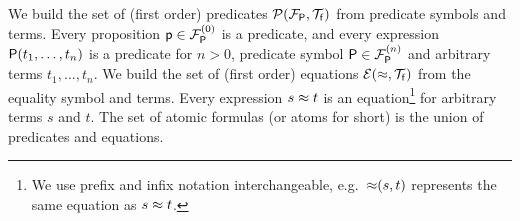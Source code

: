 
\begin{definition}\label{def:predicates}\label{def:equations}\label{def:atoms}
	We build the set of (first order) {\myem predicates} $\mcPT$
	from predicate symbols and terms. 
	Every proposition $\mpp\in \mcFPn[0]$ is a predicate, 
	and every expression $\mP(t_1,\ldots,t_n)$ is a predicate for $n>0$,
	predicate symbol $\mP\in\mcFPn$ and arbitrary terms $t_1,\ldots,t_n$.
%	
	We build the set of (first order) {\myem equations }$\mcET$ from the equality symbol and terms.
	Every expression $s\mEQ t$ is an equation\footnote{
		We use prefix and infix notation interchangeable, 
		e.g.~${\mEQ}(s,t)$ represents the same equation as $s\mEQ t$.} 
	for arbitrary terms $s$ and $t$.
%	
	The set of atomic formulas (or {\myem atoms }for short) is the union of predicates and equations.
\end{definition}